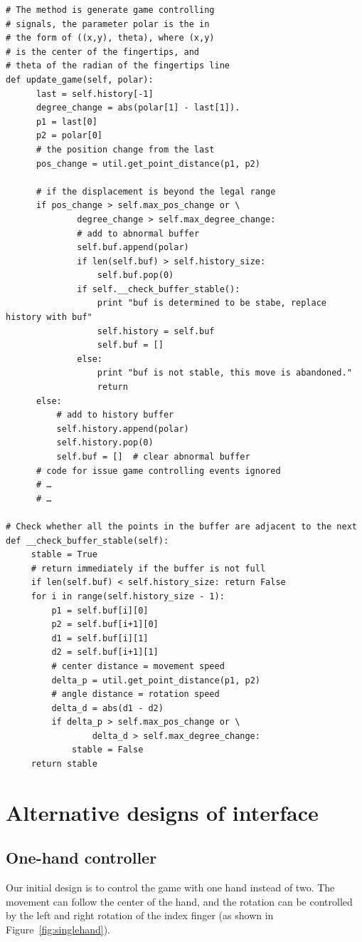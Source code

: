 \documentclass[10pt,twocolumn,letterpaper]{article}
\begin{document}
{\tiny{
\begin{verbatim}
# The method is generate game controlling 
# signals, the parameter polar is the in 
# the form of ((x,y), theta), where (x,y) 
# is the center of the fingertips, and 
# theta of the radian of the fingertips line
def update_game(self, polar):
      last = self.history[-1]
      degree_change = abs(polar[1] - last[1]).
      p1 = last[0]
      p2 = polar[0]
      # the position change from the last
      pos_change = util.get_point_distance(p1, p2)

      # if the displacement is beyond the legal range
      if pos_change > self.max_pos_change or \
              degree_change > self.max_degree_change: 
              # add to abnormal buffer
              self.buf.append(polar)
              if len(self.buf) > self.history_size:
                  self.buf.pop(0) 
              if self.__check_buffer_stable():
                  print "buf is determined to be stabe, replace history with buf"
                  self.history = self.buf
                  self.buf = []
              else:
                  print "buf is not stable, this move is abandoned."
                  return
      else:
          # add to history buffer
          self.history.append(polar)
          self.history.pop(0)
          self.buf = []  # clear abnormal buffer
      # code for issue game controlling events ignored
      # …
      # …

# Check whether all the points in the buffer are adjacent to the next
def __check_buffer_stable(self):
     stable = True
     # return immediately if the buffer is not full
     if len(self.buf) < self.history_size: return False 
     for i in range(self.history_size - 1):
         p1 = self.buf[i][0]
         p2 = self.buf[i+1][0]
         d1 = self.buf[i][1]
         d2 = self.buf[i+1][1]
         # center distance = movement speed
         delta_p = util.get_point_distance(p1, p2) 
         # angle distance = rotation speed
         delta_d = abs(d1 - d2)   
         if delta_p > self.max_pos_change or \
                 delta_d > self.max_degree_change:
             stable = False
     return stable
\end{verbatim}
}}

\section{Alternative designs of interface}
\subsection{One-hand controller}
Our initial design is to control the game with one hand instead of two. 
The movement can follow the center of the hand, and the rotation can be 
controlled by the left and right rotation of the index finger (as shown in 
Figure~\ref{fig:singlehand}).
\end{document}
